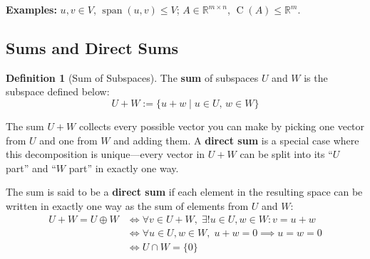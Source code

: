\documentclass[11pt]{article}
\theoremstyle{definition}
\newtheorem{definition}{Definition}[section]
\theoremstyle{plain}
\theoremstyle{remark}
\DeclareMathOperator{\spn}{span}
\DeclareMathOperator{\Col}{C}
\begin{document}
\textbf{Examples:} $u, v \in V$, $\spn(u,v) \leq V$; \quad $A \in \mathbb{R}^{m \times n}$, $\Col(A) \leq \mathbb{R}^m$.

\subsection{Sums and Direct Sums}

\begin{definition}[Sum of Subspaces]
The \textbf{sum} of subspaces $U$ and $W$ is the subspace defined below:
\[
U + W := \{u + w \mid u \in U,\, w \in W\}
\]
\end{definition}

\begin{intuitionbox}
The sum $U + W$ collects every possible vector you can make by picking one vector from $U$ and one from $W$ and adding them. A \textbf{direct sum} is a special case where this decomposition is unique---every vector in $U + W$ can be split into its ``$U$ part'' and ``$W$ part'' in exactly one way.
\end{intuitionbox}

The sum is said to be a \textbf{direct sum} if each element in the resulting space can be written in exactly one way as the sum of elements from $U$ and $W$:
\begin{align*}
U + W = U \oplus W &\iff \forall v \in U + W,\; \exists! u \in U, w \in W : v = u + w \\
&\iff \forall u \in U, w \in W,\; u + w = 0 \implies u = w = 0 \\
&\iff U \cap W = \{0\}
\end{align*}
\end{document}
